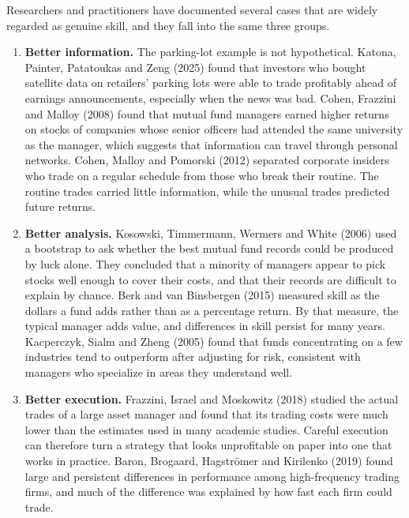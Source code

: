\begin{itemize}
  
  Researchers and practitioners have documented several cases that are widely
  regarded as genuine skill, and they fall into the same three groups.
  
  \begin{enumerate}
    \item \textbf{Better information.} The parking-lot example is not hypothetical.
  Katona, Painter, Patatoukas and Zeng (2025) found that investors who bought
  satellite data on retailers' parking lots were able to trade profitably
  ahead of earnings announcements, especially when the news was bad. Cohen,
  Frazzini and Malloy (2008) found that mutual fund managers earned higher
  returns on stocks of companies whose senior officers had attended the same
  university as the manager, which suggests that information can travel
  through personal networks. Cohen, Malloy and Pomorski (2012) separated
  corporate insiders who trade on a regular schedule from those who break
  their routine. The routine trades carried little information, while the
  unusual trades predicted future returns.

    \item \textbf{Better analysis.} Kosowski, Timmermann, Wermers and White (2006)
  used a bootstrap to ask whether the best mutual fund records could be
  produced by luck alone. They concluded that a minority of managers appear
  to pick stocks well enough to cover their costs, and that their records are
  difficult to explain by chance. Berk and van Binsbergen (2015) measured
  skill as the dollars a fund adds rather than as a percentage return. By
  that measure, the typical manager adds value, and differences in skill
  persist for many years. Kacperczyk, Sialm and Zheng (2005) found that funds
  concentrating on a few industries tend to outperform after adjusting for
  risk, consistent with managers who specialize in areas they understand well.

    \item \textbf{Better execution.} Frazzini, Israel and Moskowitz (2018) studied the
  actual trades of a large asset manager and found that its trading costs
  were much lower than the estimates used in many academic studies. Careful
  execution can therefore turn a strategy that looks unprofitable on paper
  into one that works in practice. Baron, Brogaard, Hagstr\"om{}er and
  Kirilenko (2019) found large and persistent differences in performance
  among high-frequency trading firms, and much of the difference was
  explained by how fast each firm could trade.
  

\end{enumerate}
\end{itemize}
